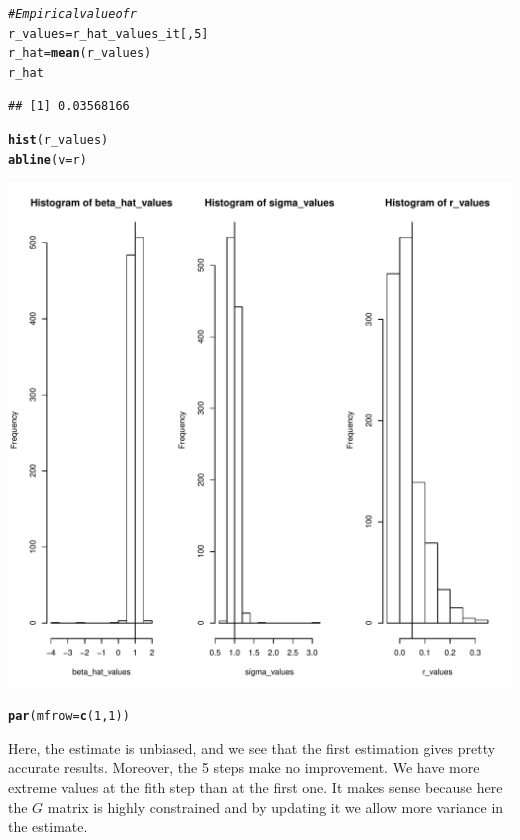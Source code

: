 \documentclass[11pt]{article}\usepackage[]{graphicx}\usepackage[]{color}
\makeatletter
\def\maxwidth{ %
  \ifdim\Gin@nat@width>\linewidth
    \linewidth
  \else
    \Gin@nat@width
  \fi
}
\newcommand{\hlnum}[1]{\textcolor[rgb]{0.686,0.059,0.569}{#1}}%
\newcommand{\hlcom}[1]{\textcolor[rgb]{0.678,0.584,0.686}{\textit{#1}}}%
\newcommand{\hlstd}[1]{\textcolor[rgb]{0.345,0.345,0.345}{#1}}%
\newcommand{\hlkwb}[1]{\textcolor[rgb]{0.69,0.353,0.396}{#1}}%
\newcommand{\hlkwc}[1]{\textcolor[rgb]{0.333,0.667,0.333}{#1}}%
\newcommand{\hlkwd}[1]{\textcolor[rgb]{0.737,0.353,0.396}{\textbf{#1}}}%
\newenvironment{kframe}{%
 \def\at@end@of@kframe{}%
 \ifinner\ifhmode%
  \def\at@end@of@kframe{\end{minipage}}%
  \begin{minipage}{\columnwidth}%
 \fi\fi%
 \def\FrameCommand##1{\hskip\@totalleftmargin \hskip-\fboxsep
 \colorbox{shadecolor}{##1}\hskip-\fboxsep
     \hskip-\linewidth \hskip-\@totalleftmargin \hskip\columnwidth}%
 \MakeFramed {\advance\hsize-\width
   \@totalleftmargin\z@ \linewidth\hsize
   \@setminipage}}%
 {\par\unskip\endMakeFramed%
 \at@end@of@kframe}
\newenvironment{knitrout}{}{} %
\makeatother
\begin{document}
\begin{knitrout}
\begin{kframe}
\begin{alltt}
\hlcom{# Empirical value of r}
\hlstd{r_values} \hlkwb{=} \hlstd{r_hat_values_it[,}\hlnum{5}\hlstd{]}
\hlstd{r_hat} \hlkwb{=} \hlkwd{mean}\hlstd{(r_values)}
\hlstd{r_hat}
\end{alltt}
\begin{verbatim}
## [1] 0.03568166
\end{verbatim}
\begin{alltt}
\hlkwd{hist}\hlstd{(r_values)}
\hlkwd{abline}\hlstd{(}\hlkwc{v} \hlstd{= r)}
\end{alltt}
\end{kframe}
\includegraphics[width=\maxwidth]{figure/unnamed-chunk-6-2} 
\begin{kframe}\begin{alltt}
\hlkwd{par}\hlstd{(}\hlkwc{mfrow} \hlstd{=} \hlkwd{c}\hlstd{(}\hlnum{1}\hlstd{,}\hlnum{1}\hlstd{))}
\end{alltt}
\end{kframe}
\end{knitrout}
Here, the estimate is unbiased, and we see that the first estimation gives pretty accurate results. Moreover, the 5 steps make no improvement. We have more extreme values at the fith step than at the first one. It makes sense because here the $G$ matrix is highly constrained and by updating it we allow more variance in the estimate.
\end{document}
